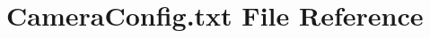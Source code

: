 \hypertarget{CameraConfig_8txt}{}\section{Camera\+Config.\+txt File Reference}
\label{CameraConfig_8txt}
